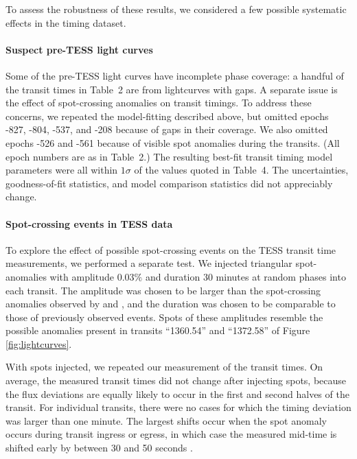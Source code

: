\documentclass[12pt,twocolumn,tighten]{aastex62}
\begin{document}
{To assess the robustness of these results, we considered a few
possible systematic effects in the timing dataset.  

\paragraph{Suspect pre-TESS light curves}
Some of the
pre-TESS light curves have incomplete phase coverage: a handful
of the transit times in Table~2 are from lightcurves with 
gaps.  A separate issue is the effect of spot-crossing anomalies on
transit timings.  To address these concerns, we repeated
the model-fitting described above, but omitted epochs -827, -804,
-537, and -208 because of gaps in their coverage.  We also omitted
epochs -526 and -561 because of visible spot anomalies during the
transits. (All epoch numbers are as in Table~2.)  The resulting
best-fit transit timing model parameters were all within $1\sigma$ of
the values quoted in Table~4.  The uncertainties, goodness-of-fit
statistics, and model comparison statistics did not appreciably
change.

\paragraph{Spot-crossing events in TESS data}
To explore the effect of possible spot-crossing events on the TESS
transit time measurements, we performed a separate test.  We injected
triangular spot-anomalies with amplitude $0.03\%$ and duration 30
minutes at random phases into each transit.  The amplitude was
chosen to be larger than the spot-crossing anomalies observed by
\citet{southworth_high-precision_2009} and
\citet{sanchis-ojeda_starspots_2011}, and the duration was chosen
to be comparable to those of previously observed events.
Spots of these amplitudes resemble the possible anomalies present
in transits ``1360.54'' and ``1372.58'' of Figure
\ref{fig:lightcurves}.

With spots injected, we repeated our measurement of the transit times.
On average, the measured transit times did not change after injecting spots,
because the flux deviations are equally likely to occur
in the first and second halves of the transit. 
For individual transits, there were no cases for which the
timing deviation was larger than one minute.  The largest 
shifts occur when the spot anomaly occurs during transit ingress or egress, in
which case the measured mid-time is shifted early by between 30 and 50
seconds \citep[qualitatively similar to results found
by][]{ioannidis_how_2016}.

}
\end{document}

